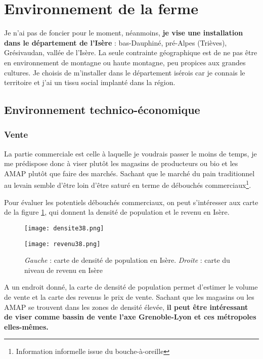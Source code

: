 \documentclass{article}
\begin{document}
\section{Environnement de la ferme}

Je n'ai pas de foncier pour le moment, néanmoins, \textbf{je vise une installation dans le département de l'Isère} : bas-Dauphiné, pré-Alpes (Trièves), Grésivaudan, vallée de l'Isère. La seule contrainte géographique est de ne pas être en environnement de montagne ou haute montagne, peu propices aux grandes cultures. Je choisis de m'installer dans le département isérois car je connais le territoire et j'ai un tissu social implanté dans la région.

\subsection{Environnement technico-économique}

\subsubsection*{Vente}

La partie commerciale est celle à laquelle je voudrais passer le moins de temps, je me prédispose donc à viser plutôt les magasins de producteurs ou bio et les AMAP plutôt que faire des marchés. Sachant que le marché du pain traditionnel au levain semble d'être loin d'être saturé en terme de débouchés commerciaux\footnote{Information informelle issue du bouche-à-oreille}. 

Pour évaluer les potentiels débouchés commerciaux, on peut s'intéresser aux carte de la figure \ref{fig:test}, qui donnent la densité de population et le revenu en Isère.

\begin{figure}[h!]
\centering
\begin{minipage}{.5\textwidth}
  \centering
  \texttt{[image: densite38.png]}
\end{minipage}%
\begin{minipage}{.5\textwidth}
  \centering
  \texttt{[image: revenu38.png]}
\end{minipage}
\caption{\textit{Gauche} : carte de densité de population en Isère. \textit{Droite} : carte du niveau de revenu en Isère}
\label{fig:test}
\end{figure}

A un endroit donné, la carte de densité de population permet d'estimer le volume de vente et la carte des revenus le prix de vente. Sachant que les magasins ou les AMAP se trouvent dans les zones de densité élevée, \textbf{il peut être intéressant de viser comme bassin de vente l'axe Grenoble-Lyon et ces métropoles elles-mêmes.}
\end{document}
